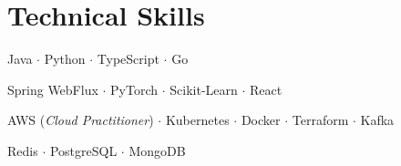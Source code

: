 \documentclass[letterpaper,11pt]{article}
\begin{document}
\section{Technical Skills}
 \begin{description}[leftmargin=!,labelwidth=\widthof{\textsc{Frameworks/Libraries}}, itemsep=0.5pt, parsep=0.5pt, font=\normalfont\small]
    \item[\textsc{Languages:}] \small Java $\cdot$ Python $\cdot$ TypeScript $\cdot$ Go
    \item[\textsc{Frameworks/Libraries:}]  Spring WebFlux $\cdot$ PyTorch $\cdot$ Scikit-Learn $\cdot$ React
    \item[\textsc{Cloud/DevOps:}] \small AWS (\textit{Cloud Practitioner}) $\cdot$ Kubernetes $\cdot$ Docker $\cdot$ Terraform $\cdot$ Kafka
    \item[\textsc{Databases:}] \small Redis $\cdot$ PostgreSQL $\cdot$ MongoDB
    
\end{description}
\vspace{-4pt}


\end{document}
